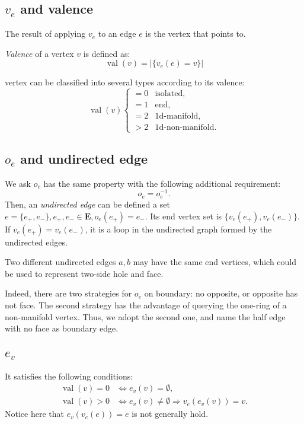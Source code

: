 \documentclass[9pt,twocolumn]{extarticle}
\newcommand{\SET}[1]{\mathbf{#1}}
\DeclareMathOperator{\VAL}{val}
\begin{document}
\subsection{$v_e$ and valence}
The result of applying $v_e$ to an edge $e$ is the vertex that points
to.

{\em Valence} of a vertex $v$ is defined as:
\begin{equation}
  \VAL(v)=|\{v_e(e)=v\}|
\end{equation}

vertex can be classified into several types according to its valence:
\begin{equation}
  \VAL(v)
  \begin{cases}
    =0&\text{isolated},\\
    =1&\text{end},\\
    =2&\text{1d-manifold},\\
    >2&\text{1d-non-manifold}.
  \end{cases}
\end{equation}

\subsection{$o_e$ and undirected edge}
We ask $o_e$ has the same property with the following additional
requirement:
\begin{equation}
  o_e = o_e^{-1}.
  \label{eq:o_e}
\end{equation}
Then, an {\em undirected edge} can be defined a set $e = \{e_+, e_-\},
e_+,e_- \in \SET{E}, o_e(e_+)=e_-$.  Its end vertex set is
$\{v_e(e_+),v_e(e_-)\}$.  If $v_e(e_+) = v_e(e_-)$, it is a loop in
the undirected graph formed by the undirected edges.

Two different undirected edges $a,b$ may have the same end
vertices, which could be used to represent two-side hole and face.

Indeed, there are two strategies for $o_e$ on boundary: no opposite,
or opposite has not face.  The second strategy has the advantage of
querying the one-ring of a non-manifold vertex.  Thus, we adopt the
second one, and name the half edge with no face as boundary edge.

\subsection{$e_v$}
It satisfies the following conditions:
\begin{equation}
  \begin{split}
    \VAL(v) = 0 &\Leftrightarrow e_v(v) = \emptyset,\\
    \VAL(v) > 0 &\Leftrightarrow
    e_v(v) \neq \emptyset \Rightarrow v_e(e_v(v)) = v.
  \end{split}
  \label{eq:e_v}
\end{equation}
Notice here that $e_v(v_e(e)) = e$ is not generally hold.
\end{document}
